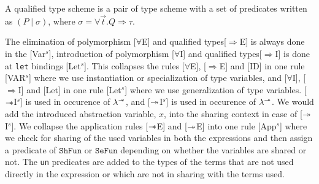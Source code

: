 \begin{defn}
  A qualified type scheme is a pair of type scheme with a set of predicates written as $(P \mid \sigma)$,
  where $\sigma = \forall \vec{t}. Q \Rightarrow \tau$.
\end{defn}

The elimination of polymorphism [$\forall$E] and qualified types[$\Rightarrow$E] is always done in the [Var$^s$],
introduction of polymorphism [$\forall$I] and qualified types[$\Rightarrow$I] is
done at \texttt{let} bindings [Let$^s$]. This collapses the rules [$\forall$E], [$\Rightarrow$E] and [ID] in one rule [VAR$^s$] where
we use instantiation or specialization of type variables, and [$\forall$I], [$\Rightarrow$I] and [Let] in one rule [Let$^s$] where we use generalization of type variables.
[$\mathrel{-\mkern-6mu*}$I$^s$] is used in occurence of $\lambda^{\mathrel{-\mkern-6mu*}} $, and [$\twoheadrightarrow$I$^s$] is used in occurence of $\lambda^{\twoheadrightarrow}$.
We would add the introduced abstraction variable, $x$, into the sharing context in case of [$\twoheadrightarrow$I$^s$].
We collapse the application rules [$\mathrel{-\mkern-6mu*}$E] and [$\twoheadrightarrow$E] into one rule [App$^s$] where we check for sharing of the used variables in both
the expressions and then assign a predicate of $\texttt{ShFun}$ or $\texttt{SeFun}$ depending on whether the variables
are shared or not. The \texttt{un} predicates are added to the types of the terms that are not used directly in the expression
or which are not in sharing with the terms used.

